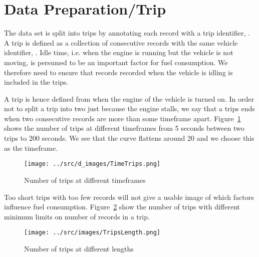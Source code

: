 \section{Data Preparation/Trip}\label{sec:trips}

The data set is split into trips by annotating each record with a trip identifier, \tid.
A trip is defined as a collection of consecutive records with the same vehicle identifier, \vid.
Idle time, i.e. when the engine is running but the vehicle is not moving, is persumed to be an important factor for fuel consumption. 
We therefore need to ensure that records recorded when the vehicle is idling is included in the trips. 

A trip is hence defined from when the engine of the vehicle is turned on.
In order not to split a trip into two just because the engine stalls, we say that a trips ends when two consecutive records are more than some timeframe apart.
Figure~\ref{fig:TimeTrips} shows the number of trips at different timeframes from 5 seconds between two trips to 200 seconds.
We see that the curve flattens around 20 and we choose this as the timeframe. 
\begin{figure}[htb]
\centering
\texttt{[image: ../src/d\_images/TimeTrips.png]}
\caption{Number of trips at different timeframes}
\label{fig:TimeTrips}
\end{figure}

Too short trips with too few records will not give a usable image of which factors influence fuel consumption.
Figure~\ref{fig:LengthTrips} show the number of trips with different minimum limits on number of records in a trip.
\begin{figure}[htb]
\centering
\texttt{[image: ../src/images/TripsLength.png]}
\caption{Number of trips at different lengths}
\label{fig:LengthTrips}
\end{figure}